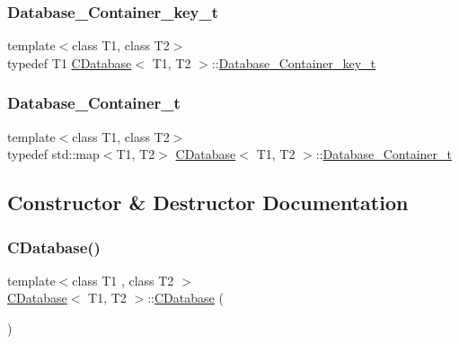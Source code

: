 \mbox{\label{classCDatabase_aa48e663caabc489e9aa738e299d10ee0}} 
\subsubsection{\texorpdfstring{Database\+\_\+\+Container\+\_\+key\+\_\+t}{Database\_Container\_key\_t}}
{\footnotesize\ttfamily template$<$class T1, class T2$>$ \\
typedef T1 \hyperlink{classCDatabase}{C\+Database}$<$ T1, T2 $>$\+::\hyperlink{classCDatabase_aa48e663caabc489e9aa738e299d10ee0}{Database\+\_\+\+Container\+\_\+key\+\_\+t}}

\mbox{\label{classCDatabase_ac20411b7c5997877aebb46d0bd3a8461}} 
\subsubsection{\texorpdfstring{Database\+\_\+\+Container\+\_\+t}{Database\_Container\_t}}
{\footnotesize\ttfamily template$<$class T1, class T2$>$ \\
typedef std\+::map$<$T1, T2$>$ \hyperlink{classCDatabase}{C\+Database}$<$ T1, T2 $>$\+::\hyperlink{classCDatabase_ac20411b7c5997877aebb46d0bd3a8461}{Database\+\_\+\+Container\+\_\+t}}



\subsection{Constructor \& Destructor Documentation}
\mbox{\label{classCDatabase_ac5fd82bb19a12e500d2f65cbd919c256}} 
\subsubsection{\texorpdfstring{C\+Database()}{CDatabase()}}
{\footnotesize\ttfamily template$<$class T1 , class T2 $>$ \\
\hyperlink{classCDatabase}{C\+Database}$<$ T1, T2 $>$\+::\hyperlink{classCDatabase}{C\+Database} (\begin{DoxyParamCaption}{ }\end{DoxyParamCaption})}

